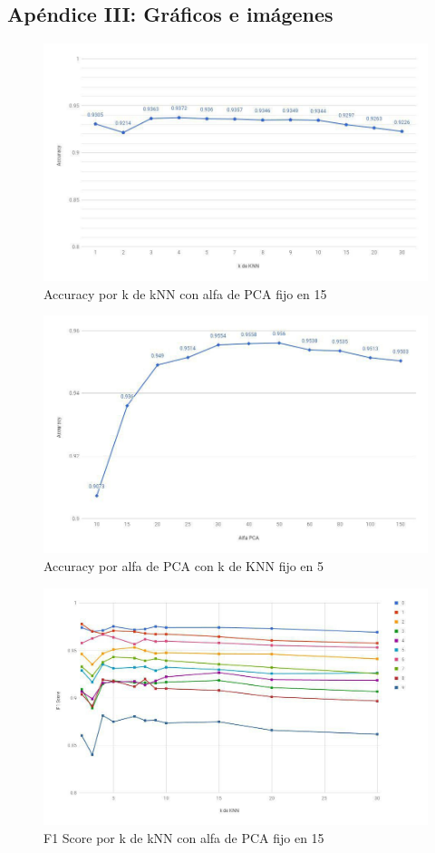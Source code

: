 \subsection{Apéndice III: Gráficos e imágenes}

\begin{figure}[H]
    \begin{center}
      \includegraphics[width=0.8\columnwidth]{imagenes/knn-accuracy.jpg}
      \caption{Accuracy por k de kNN con alfa de PCA fijo en 15}
    \end{center}
\end{figure}

\begin{figure}[H]
    \begin{center}
      \includegraphics[width=0.8\columnwidth]{imagenes/pca-accuracy.jpg}
      \caption{Accuracy por alfa de PCA con k de KNN fijo en 5}
    \end{center}
\end{figure}

\begin{figure}[H]
    \begin{center}
      \includegraphics[width=0.8\columnwidth]{imagenes/knn-f1.jpg}
      \caption{F1 Score por k de kNN con alfa de PCA fijo en 15}
    \end{center}
\end{figure}

